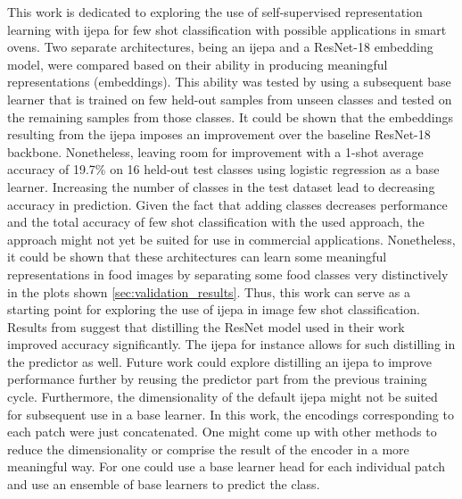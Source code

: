 This work is dedicated to exploring the use of self-supervised representation learning with \gls{ijepa} 
for few shot classification with possible applications in smart ovens. Two separate architectures, being 
an \gls{ijepa} and a ResNet-18 embedding model, were compared based on their ability in producing meaningful 
representations (embeddings). This ability was tested by using a subsequent base learner that is trained on 
few held-out samples from unseen classes and tested on the remaining samples from those classes. 
It could be shown that the embeddings resulting from the \gls{ijepa} imposes an improvement over the 
baseline ResNet-18 backbone. Nonetheless, leaving room for improvement with a 1-shot average accuracy of 19.7\% 
on 16 held-out test classes using logistic regression as a base learner. Increasing the number of classes 
in the test dataset lead to decreasing accuracy in prediction. Given the fact that adding classes decreases
performance and the total accuracy of few shot classification with the used approach, the approach might not yet 
be suited for use in commercial applications. Nonetheless, it could be shown that these architectures can 
learn some meaningful representations in food images by separating some food classes very distinctively in the plots shown 
\ref{sec:validation_results}. Thus, this work can serve as a starting point for exploring
the use of \gls{ijepa} in image few shot classification. Results from \cite{tian_rethinking_2020} suggest that 
distilling the ResNet model used in their work improved accuracy significantly. The \gls{ijepa} for instance allows
for such distilling in the predictor as well. Future work could explore distilling an \gls{ijepa} to improve performance
further by reusing the predictor part from the previous training cycle. Furthermore, the dimensionality of 
the default \gls{ijepa} might not be suited for subsequent use in a base learner. In this work, the encodings 
corresponding to each patch were just concatenated. One might come up with other methods to reduce the dimensionality
or comprise the result of the encoder in a more meaningful way. For one could use a base learner head for each individual
patch and use an ensemble of base learners to predict the class.
